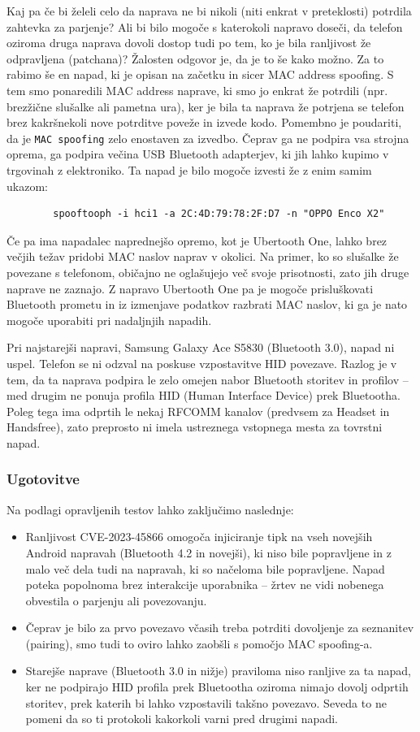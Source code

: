 \documentclass[11pt,a4paper,slovene]{article}
\begin{document}
Kaj pa če bi želeli celo da naprava ne bi nikoli (niti enkrat v preteklosti) potrdila zahtevka za parjenje? Ali bi bilo mogoče s katerokoli napravo doseči, da telefon oziroma druga naprava dovoli dostop tudi po tem, ko je bila ranljivost že odpravljena (patchana)? Žalosten odgovor je, da je to še kako možno. Za to rabimo še en napad, ki je opisan na začetku in sicer MAC address spoofing. S tem smo ponaredili MAC address naprave, ki smo jo enkrat že potrdili (npr. brezžične slušalke ali pametna ura), ker je bila ta naprava že potrjena se telefon brez kakršnekoli nove potrditve poveže in izvede kodo. Pomembno je poudariti, da je \texttt{MAC spoofing} zelo enostaven za izvedbo. Čeprav ga ne podpira vsa strojna oprema, ga podpira večina USB Bluetooth adapterjev, ki jih lahko kupimo v trgovinah z elektroniko. Ta napad je bilo mogoče izvesti že z enim samim ukazom:
\begin{verbatim}
		spooftooph -i hci1 -a 2C:4D:79:78:2F:D7 -n "OPPO Enco X2"
\end{verbatim}
Če pa ima napadalec naprednejšo opremo, kot je Ubertooth One, lahko brez večjih težav pridobi MAC naslov naprav v okolici. Na primer, ko so slušalke že povezane s telefonom, običajno ne oglašujejo več svoje prisotnosti, zato jih druge naprave ne zaznajo. Z napravo Ubertooth One pa je mogoče prisluškovati Bluetooth prometu in iz izmenjave podatkov razbrati MAC naslov, ki ga je nato mogoče uporabiti pri nadaljnjih napadih.

Pri najstarejši napravi, Samsung Galaxy Ace S5830 (Bluetooth 3.0), napad ni uspel. Telefon se ni odzval na poskuse vzpostavitve HID povezave. Razlog je v tem, da ta naprava podpira le zelo omejen nabor Bluetooth storitev in profilov – med drugim ne ponuja profila HID (Human Interface Device) prek Bluetootha. Poleg tega ima odprtih le nekaj RFCOMM kanalov (predvsem za Headset in Handsfree), zato preprosto ni imela ustreznega vstopnega mesta za tovrstni napad.

\subsubsection{Ugotovitve}

Na podlagi opravljenih testov lahko zaključimo naslednje:
\begin{itemize}
	\item Ranljivost CVE-2023-45866 omogoča injiciranje tipk na vseh novejših Android napravah (Bluetooth 4.2 in novejši), ki niso bile popravljene in z malo več dela tudi na napravah, ki so načeloma bile popravljene. Napad poteka popolnoma brez interakcije uporabnika – žrtev ne vidi nobenega obvestila o parjenju ali povezovanju.
	\item Čeprav je bilo za prvo povezavo včasih treba potrditi dovoljenje za seznanitev (pairing), smo tudi to oviro lahko zaobšli s pomočjo MAC spoofing-a.
	\item Starejše naprave (Bluetooth 3.0 in nižje) praviloma niso ranljive za ta napad, ker ne podpirajo HID profila prek Bluetootha oziroma nimajo dovolj odprtih storitev, prek katerih bi lahko vzpostavili takšno povezavo. Seveda to ne pomeni da so ti protokoli kakorkoli varni pred drugimi napadi.
\end{itemize}
\end{document}
